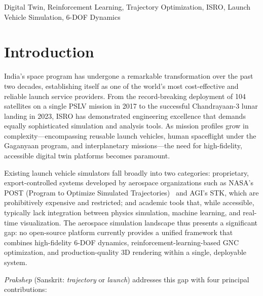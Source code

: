 \documentclass[conference]{IEEEtran}
\begin{document}
\begin{IEEEkeywords}
Digital Twin, Reinforcement Learning, Trajectory Optimization, ISRO, Launch Vehicle Simulation, 6-DOF Dynamics
\end{IEEEkeywords}

\section{Introduction}

India's space program has undergone a remarkable transformation over the past two decades, establishing itself as one of the world's most cost-effective and reliable launch service providers. From the record-breaking deployment of 104 satellites on a single PSLV mission in 2017 to the successful Chandrayaan-3 lunar landing in 2023, ISRO has demonstrated engineering excellence that demands equally sophisticated simulation and analysis tools. As mission profiles grow in complexity---encompassing reusable launch vehicles, human spaceflight under the Gaganyaan program, and interplanetary missions---the need for high-fidelity, accessible digital twin platforms becomes paramount.

Existing launch vehicle simulators fall broadly into two categories: proprietary, export-controlled systems developed by aerospace organizations such as NASA's POST (Program to Optimize Simulated Trajectories)~\cite{brauer1977post} and AGI's STK, which are prohibitively expensive and restricted; and academic tools that, while accessible, typically lack integration between physics simulation, machine learning, and real-time visualization. The aerospace simulation landscape thus presents a significant gap: no open-source platform currently provides a unified framework that combines high-fidelity 6-DOF dynamics, reinforcement-learning-based GNC optimization, and production-quality 3D rendering within a single, deployable system.

\textit{Prakshep} (Sanskrit: \textit{trajectory} or \textit{launch}) addresses this gap with four principal contributions:
\end{document}
